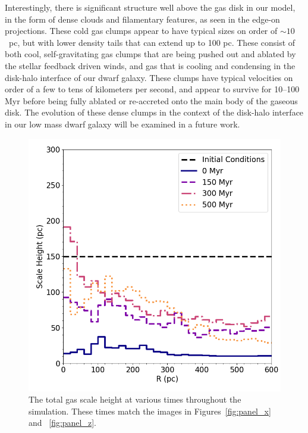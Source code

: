 \documentclass[twocolumn]{aastex61}
\begin{document}
Interestingly, there is significant structure well above the gas disk in our model, in the form of dense clouds and filamentary features, as seen in the edge-on projections. These cold gas clumps appear to have typical sizes on order of $\sim 10$~pc, but with lower density tails that can extend up to 100 pc. These consist of both cool, self-gravitating gas clumps that are being pushed out and ablated by the stellar feedback driven winds, and gas that is cooling and condensing in the disk-halo interface of our dwarf galaxy. These clumps have typical velocities on order of a few to tens of kilometers per second, and appear to survive for 10--100 Myr before being fully ablated or re-accreted onto the main body of the gaseous disk. The evolution of these dense clumps in the context of the disk-halo interface in our low mass dwarf galaxy will be examined in a future work. 

\begin{figure}
\centering
\includegraphics[width=0.975\linewidth]{scale_height}
\caption{The total gas scale height at various times throughout the simulation. These times match the images in Figures~\ref{fig:panel_x} and ~\ref{fig:panel_z}.}
\label{fig:scale_height}
\end{figure}
\end{document}
